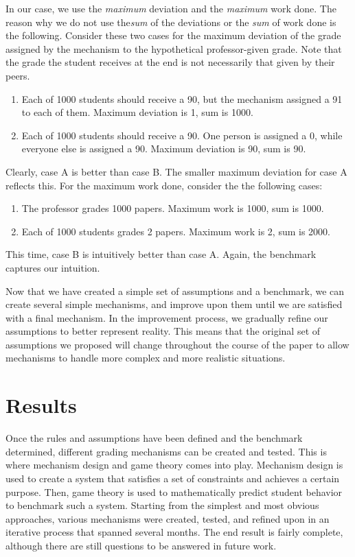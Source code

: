 \documentclass[12pt, Arial]{article}
\begin{document}
In our case, we use the \emph{maximum} deviation and the \emph{maximum} work done. The reason why we do not use the\emph{sum} of the deviations or the \emph{sum} of work done is the following. Consider these two cases for the maximum deviation of the grade assigned by the mechanism to the hypothetical professor-given grade. Note that the grade the student receives at the end is not necessarily that given by their peers.
\begin{enumerate}[label=\Alph*, itemsep=0pt, parsep=0pt]
	\item Each of 1000 students should receive a 90, but the mechanism assigned a 91 to each of them. Maximum deviation is 1, sum is 1000.
	\item Each of 1000 students should receive a 90. One person is assigned a 0, while everyone else is assigned a 90. Maximum deviation is 90, sum is 90.
\end{enumerate}
Clearly, case A is better than case B. The smaller maximum deviation for case A reflects this.
For the maximum work done, consider the the following cases:
\begin{enumerate}[label=\Alph*, itemsep=0pt, parsep=0pt]
	\item The professor grades 1000 papers. Maximum work is 1000, sum is 1000.
	\item Each of 1000 students grades 2 papers. Maximum work is 2, sum is 2000.
\end{enumerate}
This time, case B is intuitively better than case A. Again, the benchmark captures our intuition.


Now that we have created a simple set of assumptions and a benchmark, we can create several simple mechanisms, and improve upon them until we are satisfied with a final mechanism. In the improvement process, we gradually refine our assumptions to better represent reality. This means that the original set of assumptions we proposed will change throughout the course of the paper to allow mechanisms to handle more complex and more realistic situations.

\section{Results}
Once the rules and assumptions have been defined and the benchmark determined, different grading mechanisms can be created and tested. This is where mechanism design and game theory comes into play. Mechanism design is used to create a system that satisfies a set of constraints and achieves a certain purpose. Then, game theory is used to mathematically predict student behavior to benchmark such a system. Starting from the simplest and most obvious approaches, various mechanisms were created, tested, and refined upon in an iterative process that spanned several months. The end result is fairly complete, although there are still questions to be answered in future work.
\end{document}
